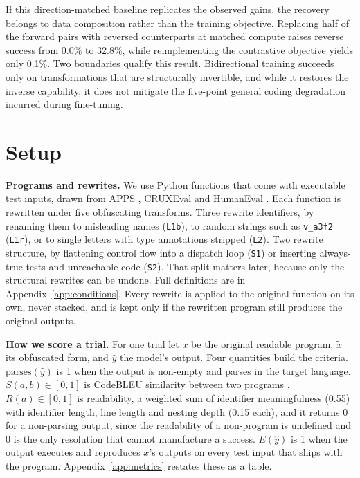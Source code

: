 \documentclass{article}
\newcommand{\arm}[1]{\texttt{#1}}
\begin{document}
If this direction-matched baseline replicates the observed gains, the recovery belongs to data composition rather than the training objective. Replacing half of the forward pairs with reversed counterparts at matched compute raises reverse success from 0.0\% to 32.8\%, while reimplementing the contrastive objective yields only 0.1\%. Two boundaries qualify this result. Bidirectional training succeeds only on transformations that are structurally invertible, and while it restores the inverse capability, it does not mitigate the five-point general coding degradation incurred during fine-tuning.

\section{Setup}
\label{sec:setup}

\textbf{Programs and rewrites.} We use Python functions that come with executable test
inputs, drawn from APPS \citep{hendrycks2021apps}, CRUXEval \citep{gu2024cruxeval} and
HumanEval \citep{chen2021codex}. Each function is rewritten under five obfuscating transforms. Three rewrite identifiers, by
renaming them to misleading names (\arm{L1b}), to random strings such as \texttt{v\_a3f2}
(\arm{L1r}), or to single letters with type annotations stripped (\arm{L2}). Two rewrite
structure, by flattening control flow into a dispatch loop (\arm{S1}) or inserting
always-true tests and unreachable code (\arm{S2}). That split matters later, because only the
structural rewrites can be undone. Full definitions are in Appendix~\ref{app:conditions}.
Every rewrite is applied to the original function on its own, never stacked, and is kept only
if the rewritten program still produces the original outputs.

\textbf{How we score a trial.} For one trial let $x$ be the original readable program,
$\tilde x$ its obfuscated form, and $\hat y$ the model's output. Four quantities build the
criteria. $\mathrm{parses}(\hat y)$ is 1 when the output is non-empty and parses in the target
language. $S(a,b)\in[0,1]$ is CodeBLEU similarity between two programs
\citep{ren2020codebleu}. $R(a)\in[0,1]$ is readability, a weighted sum of identifier
meaningfulness (0.55) with identifier length, line length and nesting depth (0.15 each), and it
returns 0 for a non-parsing output, since the readability of a non-program is undefined and 0
is the only resolution that cannot manufacture a success. $E(\hat y)$ is 1 when the output
executes and reproduces $x$'s outputs on every test input that ships with the program.
Appendix~\ref{app:metrics} restates these as a table.
\end{document}
